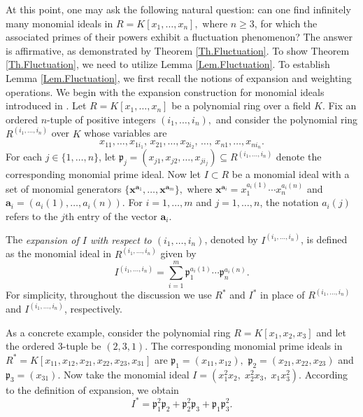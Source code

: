 \documentclass[11pt]{amsart}
\begin{document}
  

 
 At this point, one may ask the following natural question: can one find infinitely many monomial ideals in
 $R=K[x_1,\ldots,x_n],$ where $n\geq 3$, for which the associated primes of their powers exhibit a fluctuation phenomenon?
The answer is affirmative, as demonstrated by Theorem \ref{Th.Fluctuation}. To show Theorem \ref{Th.Fluctuation}, we need to utilize 
 Lemma \ref{Lem.Fluctuation}.  
To establish Lemma \ref{Lem.Fluctuation}, we first recall the notions of expansion and weighting operations. We begin with the expansion construction for monomial ideals introduced in \cite{BH}. Let $R=K[x_1,\ldots,x_n]$ be a polynomial ring over a field $K$. Fix an ordered $n$-tuple of positive integers $(i_1,\ldots,i_n),$ and consider the polynomial ring $R^{(i_1,\ldots,i_n)}$ over $K$ whose variables are
\[
x_{11},\ldots,x_{1i_1},\,
x_{21},\ldots,x_{2i_2},\,
\ldots,\,
x_{n1},\ldots,x_{ni_n}.
\]
For each $j\in\{1,\ldots,n\}$, let $\mathfrak{p}_j=(x_{j1},x_{j2},\ldots,x_{ji_j}) \subseteq R^{(i_1,\ldots,i_n)}$ 
denote the corresponding monomial prime ideal.  Now let $I\subset R$ be a monomial ideal with a set of monomial generators
 $\{\mathbf{x}^{\mathbf a_1},\ldots,\mathbf{x}^{\mathbf a_m}\},$ where $\mathbf{x}^{\mathbf a_i}
=x_1^{a_i(1)}\cdots x_n^{a_i(n)}$ and $\mathbf a_i=(a_i(1),\ldots,a_i(n)).$ 
For $i=1,\ldots,m$ and $j=1,\ldots,n$, the notation $a_i(j)$ refers to the $j$th entry of the vector $\mathbf a_i$.

The \emph{expansion of $I$ with respect to $(i_1,\ldots,i_n)$}, denoted by $I^{(i_1,\ldots,i_n)}$, is defined as the monomial ideal in $R^{(i_1,\ldots,i_n)}$ given by
\[
I^{(i_1,\ldots,i_n)}
=
\sum_{i=1}^{m}
\mathfrak p_1^{a_i(1)}
\cdots
\mathfrak p_n^{a_i(n)}.
\]
For simplicity, throughout the discussion we use $R^*$ and $I^*$ in place of
$R^{(i_1,\ldots,i_n)}$ and $I^{(i_1,\ldots,i_n)}$, respectively.

As a concrete example, consider the polynomial ring $R=K[x_1,x_2,x_3]$ and let the ordered $3$-tuple be $(2,3,1)$. 
 The corresponding monomial prime ideals in $R^*=K[x_{11},x_{12},x_{21},x_{22},x_{23},x_{31}]$ are
$\mathfrak p_1=(x_{11},x_{12}),$ $\mathfrak p_2=(x_{21},x_{22},x_{23})$ and $\mathfrak p_3=(x_{31}).$ 
Now take the monomial ideal $I=(x_1^2x_2,\;x_2^2x_3,\;x_1x_3^2).$ According to the definition of expansion, we obtain
\[
I^*
=
\mathfrak p_1^2\mathfrak p_2
+
\mathfrak p_2^2\mathfrak p_3
+
\mathfrak p_1\mathfrak p_3^2.
\]
\end{document}
